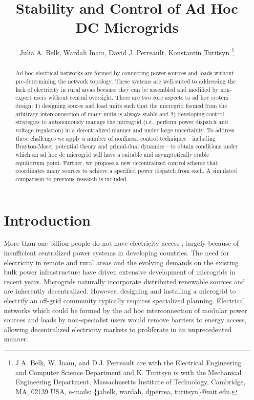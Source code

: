 \documentclass[letterpaper, 10 pt, conference]{ieeeconf}
\title{\LARGE \bf Stability and Control of Ad Hoc DC Microgrids}
\author{Julia A. Belk, Wardah Inam, David J. Perreault, Konstantin Turitsyn
\thanks{J.A. Belk, W. Inam, and D.J. Perreault are with the Electrical Engineering and Computer Science Department and K. Turitsyn is with the Mechanical Engineering Department, Massachusetts Institute of Technology, Cambridge, MA, 02139 USA, e-mails: \{jabelk, wardah, djperrea, turitsyn\}@mit.edu.
}
}
\begin{document}
\maketitle
\thispagestyle{empty}
\pagestyle{empty}

\begin{abstract}
Ad hoc electrical networks are formed by connecting power sources and loads without pre-determining the network topology. These systems are well-suited to addressing the lack of electricity in rural areas because they can be assembled and modified by non-expert users without central oversight. There are two core aspects to ad hoc system design: 1) designing source and load units such that the microgrid formed from the arbitrary interconnection of many units is always stable and 2) developing control strategies to autonomously manage the microgrid (i.e., perform power dispatch and voltage regulation) in a decentralized manner and under large uncertainty. To address these challenges we apply a number of nonlinear control techniques---including Brayton-Moser potential theory and primal-dual dynamics---to obtain conditions under which an ad hoc dc microgrid will have a suitable and asymptotically stable equilibrium point. Further, we propose a new decentralized control scheme that coordinates many sources to achieve a specified power dispatch from each. A simulated comparison to previous research is included.
\end{abstract}

\section{Introduction}

More than one billion people do not have electricity access \cite{iea15}, largely because of insufficient centralized power systems in developing countries. The need for electricity in remote and rural areas and the evolving demands on the existing bulk power infrastructure have driven extensive development of microgrids in recent years. Microgrids naturally incorporate distributed renewable sources and are inherently decentralized. However, designing and installing a microgrid to electrify an off-grid community typically requires specialized planning. Electrical networks which could be formed by the ad hoc interconnection of modular power sources and loads by non-specialist users would remove barriers to energy access, allowing decentralized electricity markets to proliferate in an unprecedented manner. 
\end{document}
